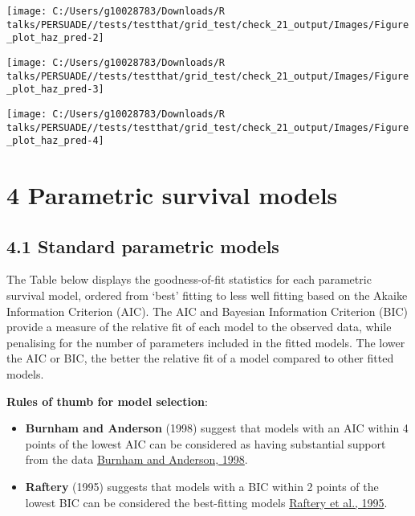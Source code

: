 \documentclass[
]{article}
\providecommand{\tightlist}{%
  \setlength{\itemsep}{0pt}\setlength{\parskip}{0pt}}
\begin{document}
\begin{flushleft}\texttt{[image: C:/Users/g10028783/Downloads/R talks/PERSUADE//tests/testthat/grid\_test/check\_21\_output/Images/Figure\_plot\_haz\_pred-2]} \end{flushleft}

\begin{flushleft}\texttt{[image: C:/Users/g10028783/Downloads/R talks/PERSUADE//tests/testthat/grid\_test/check\_21\_output/Images/Figure\_plot\_haz\_pred-3]} \end{flushleft}

\begin{flushleft}\texttt{[image: C:/Users/g10028783/Downloads/R talks/PERSUADE//tests/testthat/grid\_test/check\_21\_output/Images/Figure\_plot\_haz\_pred-4]} \end{flushleft}

\clearpage

\section{4 Parametric survival models}\label{parametric-survival-models}

\subsection{4.1 Standard parametric
models}\label{standard-parametric-models}

The Table below displays the goodness-of-fit statistics for each
parametric survival model, ordered from `best' fitting to less well
fitting based on the Akaike Information Criterion (AIC). The AIC and
Bayesian Information Criterion (BIC) provide a measure of the relative
fit of each model to the observed data, while penalising for the number
of parameters included in the fitted models. The lower the AIC or BIC,
the better the relative fit of a model compared to other fitted models.

\textbf{Rules of thumb for model selection}:

\begin{itemize}
\tightlist
\item
  \textbf{Burnham and Anderson} (1998) suggest that models with an AIC
  within 4 points of the lowest AIC can be considered as having
  substantial support from the data
  \href{https://doi.org/10.1007/978-1-4757-2917-7}{Burnham and Anderson,
  1998}.\\
\item
  \textbf{Raftery} (1995) suggests that models with a BIC within 2
  points of the lowest BIC can be considered the best-fitting models
  \href{https://doi.org/10.2307/271063}{Raftery et al., 1995}.
\end{itemize}
\end{document}
